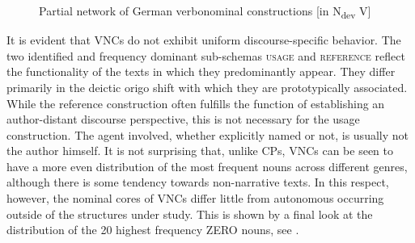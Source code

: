 \documentclass[output=paper,colorlinks,citecolor=brown]{langscibook}
\begin{document}
\begin{figure}
\centering
{}
\caption{Partial network of German verbonominal constructions [in \textup{N}\textup{\textsubscript{dev}} \textup{V]}}
\label{fig:fleissner:14}
\end{figure}

It is evident that VNCs do not exhibit uniform discourse-specific behavior. The two identified and frequency dominant sub-schemas \textsc{usage} and \textsc{reference} reflect the functionality of the texts in which they predominantly appear. They differ primarily in the deictic origo shift with which they are prototypically associated. While the reference construction often fulfills the function of establishing an author-distant discourse perspective, this is not necessary for the usage construction. The agent involved, whether explicitly named or not, is usually not the author himself. It is not surprising that, unlike CPs, VNCs can be seen to have a more even distribution of the most frequent nouns across different genres, although there is some tendency towards non-narrative texts. In this respect, however, the nominal cores of VNCs differ little from autonomous  occurring outside of the structures under study. This is shown by a final look at the distribution of the 20 highest frequency \textsc{ZERO} nouns, see .
\end{document}
